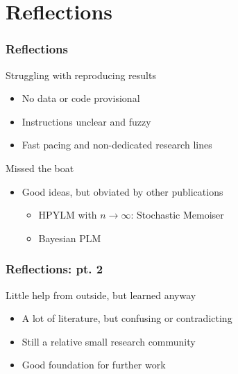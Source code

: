 \documentclass[11pt,t]{beamer}
\begin{document}
\section{Reflections}
\begin{frame}
    \frametitle{Reflections}

    \begin{block}{Struggling with reproducing results}
        \begin{itemize}
            \item No data or code provisional
            \item Instructions unclear and fuzzy
            \item Fast pacing and non-dedicated research lines
        \end{itemize}
    \end{block}

    \begin{block}{Missed the boat}
        \begin{itemize}
            \item Good ideas, but obviated by other publications
                \begin{itemize}
                    \item HPYLM with $n\rightarrow\infty$: Stochastic Memoiser
                    \item Bayesian PLM
                \end{itemize}
        \end{itemize}
    \end{block}
\end{frame}

\begin{frame}
    \frametitle{Reflections: pt. 2}
    \begin{block}{}
        Little help from outside, but learned anyway
        \begin{itemize}
            \item A lot of literature, but confusing or contradicting
            \item Still a relative small research community
            \item Good foundation for further work
        \end{itemize}

    \end{block}
\end{frame}
\end{document}
